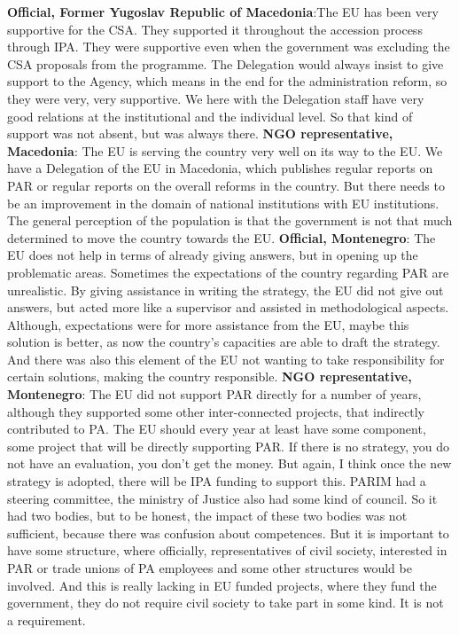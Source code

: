 \textbf{Official, Former Yugoslav Republic of Macedonia}:The EU has been very supportive for the CSA. They supported it throughout the accession process through IPA. They were supportive even when the government was excluding the CSA proposals from the programme. The Delegation would always insist to give support to the Agency, which means in the end for the administration reform, so they were very, very supportive. We here with the Delegation staff have very good relations at the institutional and the individual level. So that kind of support was not absent, but was always there.
\textbf{NGO representative, Macedonia}: The EU is serving the country very well on its way to the EU. We have a Delegation of the EU in Macedonia, which publishes regular reports on PAR or regular reports on the overall reforms in the country. But there needs to be an improvement in the domain of national institutions with EU institutions. The general perception of the population is that the government is not that much determined to move the country towards the EU. 
\textbf{Official, Montenegro}: The EU does not help in terms of already giving answers, but in opening up the problematic areas. Sometimes the expectations of the country regarding PAR are unrealistic. By giving assistance in writing the strategy, the EU did not give out answers, but acted more like a supervisor and assisted in methodological aspects. Although, expectations were for more assistance from the EU, maybe this solution is better, as now the country’s capacities are able to draft the strategy. And there was also this element of the EU not wanting to take responsibility for certain solutions, making the country responsible. 
\textbf{NGO representative, Montenegro}: The EU did not support PAR directly for a number of years, although they supported some other inter-connected projects, that indirectly contributed to PA. The EU should every year at least have some component, some project that will be directly supporting PAR. If there is no strategy, you do not have an evaluation, you don’t get the money. But again, I think once the new strategy is adopted, there will be IPA funding to support this. PARIM had a steering committee, the ministry of Justice also had some kind of council. So it had two bodies, but to be honest, the impact of these two bodies was not sufficient, because there was confusion about competences. But it is important to have some structure, where officially, representatives of civil society, interested in PAR or trade unions of PA employees and some other structures would be involved. And this is really lacking in EU funded projects, where they fund the government, they do not require civil society to take part in some kind. It is not a requirement.%
